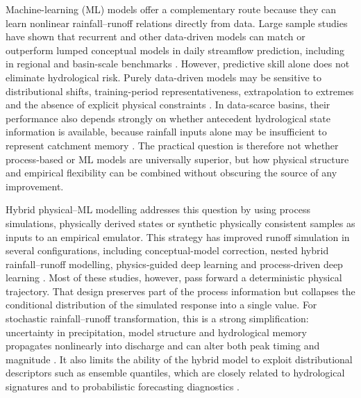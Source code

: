 \documentclass[a4paper,fleqn]{cas-sc}
\begin{document}
Machine-learning (ML) models offer a complementary route because they
can learn nonlinear rainfall--runoff relations directly from data. Large
sample studies have shown that recurrent and other data-driven models
can match or outperform lumped conceptual models in daily streamflow
prediction, including in regional and basin-scale benchmarks
\citep{kratzert2019towards,lees2021benchmarking,arsenault2022continuous}.
However, predictive skill alone does not eliminate hydrological risk.
Purely data-driven models may be sensitive to distributional shifts,
training-period representativeness, extrapolation to extremes and the
absence of explicit physical constraints
\citep{frame2021deep,zhong2023developing}. In data-scarce basins, their
performance also depends strongly on whether antecedent hydrological
state information is available, because rainfall inputs alone may be
insufficient to represent catchment memory
\citep{adnan2021comparison,okkan2021embedding}. The practical question
is therefore not whether process-based or ML models are universally
superior, but how physical structure and empirical flexibility can be
combined without obscuring the source of any improvement.

Hybrid physical--ML modelling addresses this question by using process
simulations, physically derived states or synthetic physically
consistent samples as inputs to an empirical emulator. This strategy has
improved runoff simulation in several configurations, including
conceptual-model correction, nested hybrid rainfall--runoff modelling,
physics-guided deep learning and process-driven deep learning
\citep{mekonnen2015hybrid,mohammadi2022ihacres,okkan2021embedding,yang2020physical,xie2021physics,li2024process,zhu2025hybrid}.
Most of these studies, however, pass forward a deterministic physical
trajectory. That design preserves part of the process information but
collapses the conditional distribution of the simulated response into a
single value. For stochastic rainfall--runoff transformation, this is a
strong simplification: uncertainty in precipitation, model structure and
hydrological memory propagates nonlinearly into discharge and can alter
both peak timing and magnitude
\citep{gabellani2007propagation,hong2006uncertainty}. It also limits the
ability of the hybrid model to exploit distributional descriptors such
as ensemble quantiles, which are closely related to hydrological
signatures and to probabilistic forecasting diagnostics
\citep{guo2021regionalization,papacharalampous2022review}.
\end{document}
